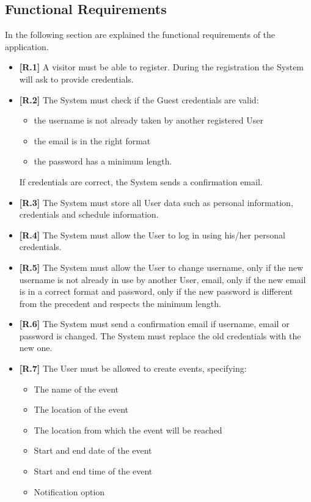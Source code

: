 \subsection{Functional Requirements}
In the following section are explained the functional requirements of the application.
\begin{itemize}
	\item \textbf{[R.1]} A visitor must be able to register. During the registration the System will ask to provide credentials.
	\item \textbf{[R.2]} The System must check if the Guest credentials are valid: 
	\begin{itemize}
		\item the username is not already taken by another registered User
		\item the email is in the right format
		\item the password has a minimum length.
	\end{itemize} If credentials are correct, the System sends a confirmation email.
	\item \textbf{[R.3]} The System must store all User data such as personal information, credentials and schedule information.
	\item \textbf{[R.4]} The System must allow the User to log in using his/her personal credentials.
	\item \textbf{[R.5]} The System must allow the User to change username, only if the new username is not already in use by another User, email, only if the new email is in a correct format and password, only if the new password is different from the precedent and respects the minimum length.
	\item \textbf{[R.6]} The System must send a confirmation email if username, email or password is changed. The System must replace the old credentials with the new one.
	\item \textbf{[R.7]} The User must be allowed to create events, specifying:
	\begin{itemize}
		\item The name of the event
		\item The location of the event
		\item The location from which the event will be reached
		\item Start and end date of the event
		\item Start and end time of the event
		\item Notification option
	\end{itemize}

\end{itemize}
